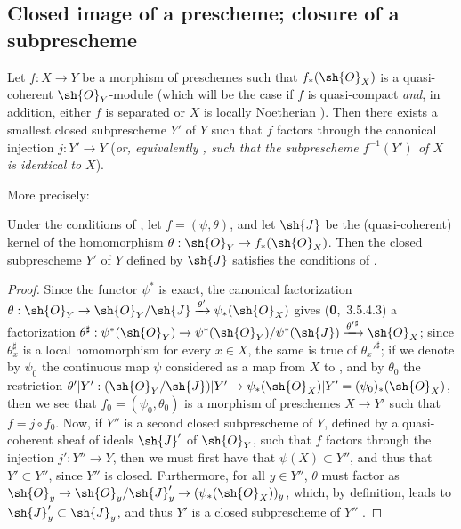\subsection{Closed image of a prescheme; closure of a subprescheme}
\label{subsection:I.9.5}

\begin{proposition}[9.5.1]
\label{I.9.5.1}
Let $f:X\to Y$ be a morphism of preschemes such that $f_*(\sh{O}_X)$ is a quasi-coherent
$\sh{O}_Y$-module (which will be the case if $f$ is quasi-compact \emph{and}, in addition, either $f$ is separated or $X$ is locally Noetherian ). Then there exists a smallest
closed subprescheme $Y'$ of $Y$ such that $f$ factors through the canonical injection $j:Y'\to Y$
(\emph{or, equivalently , such that the subprescheme $f^{-1}(Y')$ of $X$ is
\emph{identical} to $X$}).
\end{proposition}

More precisely:
\begin{corollary}[9.5.2]
\label{I.9.5.2}
Under the conditions of , let $f=(\psi,\theta)$, and let $\sh{J}$ be the
(quasi-coherent) kernel of the homomorphism $\theta:\sh{O}_Y\to f_*(\sh{O}_X)$. Then the closed
subprescheme $Y'$ of $Y$ defined by $\sh{J}$ satisfies the conditions of .
\end{corollary}

\begin{proof}
Since the functor $\psi^*$ is exact, the canonical factorization
$\theta:\sh{O}_Y\to\sh{O}_Y/\sh{J}\xrightarrow{\theta'}\psi_*(\sh{O}_X)$ gives (\textbf{0},~3.5.4.3)
a factorization
$\theta^\sharp:\psi^*(\sh{O}_Y)\to\psi^*(\sh{O}_Y)/\psi^*(\sh{J})
  \xrightarrow{{\theta'}^\sharp}\sh{O}_X$; since $\theta_x^\sharp$ is a local homomorphism for
every $x\in X$, the same is true of ${\theta_x'}^\sharp$; if we denote by $\psi_0$ the
continuous map $\psi$ considered as a map from $X$ to , and by $\theta_0$ the restriction
$\theta'|Y':(\sh{O}_Y/\sh{J})|Y'\to\psi_*(\sh{O}_X)|Y'=(\psi_0)_*(\sh{O}_X)$, then we see that
$f_0=(\psi_0,\theta_0)$ is a morphism of preschemes $X\to Y'$  such that
$f=j\circ f_0$. Now, if $Y''$
is a second closed subprescheme of $Y$, defined by a quasi-coherent sheaf of ideals $\sh{J}'$ of
$\sh{O}_Y$, such that $f$ factors through the injection $j':Y''\to Y$, then we must
first have that $\psi(X)\subset Y''$, and thus that $Y'\subset Y''$, since $Y''$ is closed.
Furthermore, for all $y\in Y''$, $\theta$ must factor as
$\sh{O}_y\to\sh{O}_y/\sh{J}'_y\to(\psi_*(\sh{O}_X))_y$, which, by definition, leads to
$\sh{J}'_y\subset\sh{J}_y$, and thus $Y'$ is a closed subprescheme of $Y''$
.
\end{proof}

